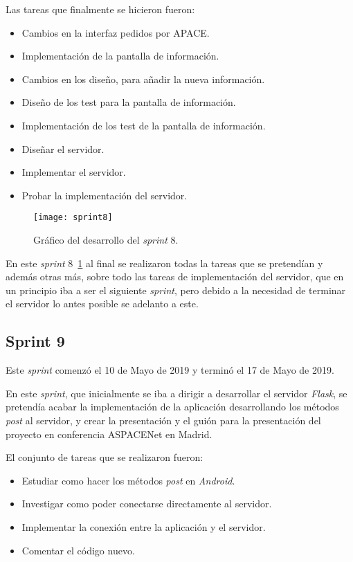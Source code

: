 Las tareas que finalmente se hicieron fueron:
\begin{itemize}
	\item Cambios en la interfaz pedidos por APACE.
	\item Implementación de la pantalla de información.
	\item Cambios en los diseño, para añadir la nueva información.
	\item Diseño de los test para la pantalla de información.
	\item Implementación de los test de la pantalla de información.
	\item Diseñar el servidor.
	\item Implementar el servidor.
	\item Probar la implementación del servidor.
\end{itemize}

\begin{figure}
	\centering
	\texttt{[image: sprint8]}
	\caption{Gráfico del desarrollo del \textit{sprint} 8.}
	\label{fig:sprint8}
\end{figure}

En este \textit{sprint} 8~\ref{fig:sprint8} al final se realizaron todas la tareas que se pretendían y además otras más, sobre todo las tareas de implementación del servidor, que en un principio iba a ser el siguiente \textit{sprint}, pero debido a la necesidad de terminar el servidor lo antes posible se adelanto a este.

\subsection{Sprint 9}
Este \textit{sprint} comenzó el 10 de Mayo de 2019 y terminó el 17 de Mayo de 2019.

En este \textit{sprint}, que inicialmente se iba a dirigir a desarrollar el servidor \textit{Flask}, se pretendía acabar la implementación de la aplicación desarrollando los métodos \textit{post} al servidor, y crear la presentación y el guión para la presentación del proyecto en conferencia ASPACENet en Madrid.

El conjunto de tareas que se realizaron fueron:
\begin{itemize}
	\item Estudiar como hacer los métodos \textit{post} en \textit{Android}.
	\item Investigar como poder conectarse directamente al servidor.
	\item Implementar la conexión entre la aplicación y el servidor.
	\item Comentar el código nuevo.
\end{itemize}

